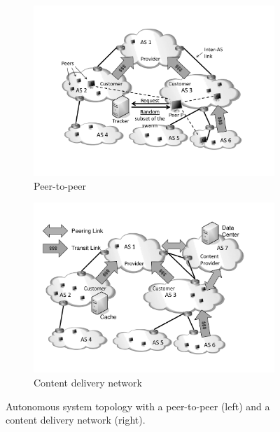 \begin{figure}[bt]
	\centering
\vspace{-0.2cm}
\hspace{-0.5cm}
	\begin{subfigure}[b]{0.54\textwidth}
	  \includegraphics[width=\textwidth]{aslevel/figs/p2p}
    \vspace{-0.5cm}
    \caption{Peer-to-peer}
    \label{fig:aslevel:p2p}
  \end{subfigure}
\hspace{-0.5cm}
	\begin{subfigure}[b]{0.54\textwidth}
	 	\includegraphics[width=\textwidth]{aslevel/figs/cdn}
    \vspace{-0.5cm}
    \caption{Content delivery network}
    \label{fig:aslevel:cdn}
	\end{subfigure}
\hspace{-0.5cm}
	\caption{Autonomous system topology with a peer-to-peer (left) and a content delivery network (right).}\label{fig:aslevel:p2pcdn}
\end{figure}

